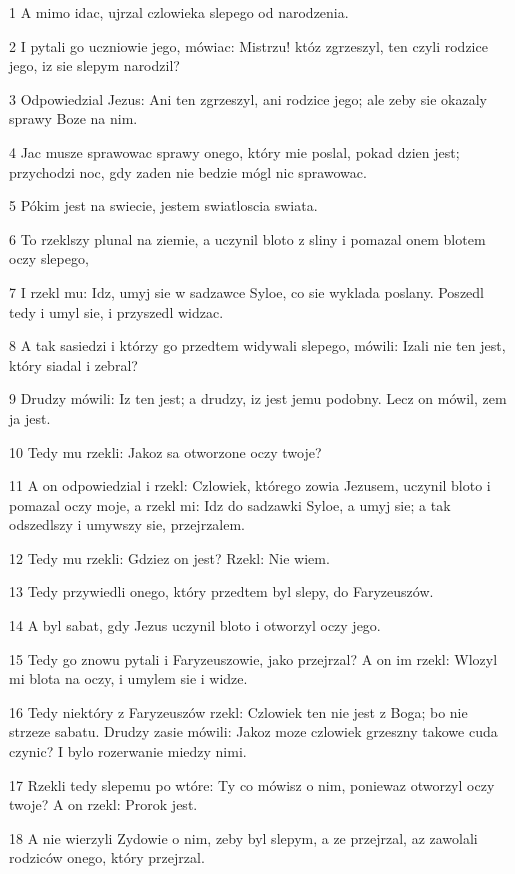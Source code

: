 \par 1 A mimo idac, ujrzal czlowieka slepego od narodzenia.
\par 2 I pytali go uczniowie jego, mówiac: Mistrzu! któz zgrzeszyl, ten czyli rodzice jego, iz sie slepym narodzil?
\par 3 Odpowiedzial Jezus: Ani ten zgrzeszyl, ani rodzice jego; ale zeby sie okazaly sprawy Boze na nim.
\par 4 Jac musze sprawowac sprawy onego, który mie poslal, pokad dzien jest; przychodzi noc, gdy zaden nie bedzie mógl nic sprawowac.
\par 5 Pókim jest na swiecie, jestem swiatloscia swiata.
\par 6 To rzeklszy plunal na ziemie, a uczynil bloto z sliny i pomazal onem blotem oczy slepego,
\par 7 I rzekl mu: Idz, umyj sie w sadzawce Syloe, co sie wyklada poslany. Poszedl tedy i umyl sie, i przyszedl widzac.
\par 8 A tak sasiedzi i którzy go przedtem widywali slepego, mówili: Izali nie ten jest, który siadal i zebral?
\par 9 Drudzy mówili: Iz ten jest; a drudzy, iz jest jemu podobny. Lecz on mówil, zem ja jest.
\par 10 Tedy mu rzekli: Jakoz sa otworzone oczy twoje?
\par 11 A on odpowiedzial i rzekl: Czlowiek, którego zowia Jezusem, uczynil bloto i pomazal oczy moje, a rzekl mi: Idz do sadzawki Syloe, a umyj sie; a tak odszedlszy i umywszy sie, przejrzalem.
\par 12 Tedy mu rzekli: Gdziez on jest? Rzekl: Nie wiem.
\par 13 Tedy przywiedli onego, który przedtem byl slepy, do Faryzeuszów.
\par 14 A byl sabat, gdy Jezus uczynil bloto i otworzyl oczy jego.
\par 15 Tedy go znowu pytali i Faryzeuszowie, jako przejrzal? A on im rzekl: Wlozyl mi blota na oczy, i umylem sie i widze.
\par 16 Tedy niektóry z Faryzeuszów rzekl: Czlowiek ten nie jest z Boga; bo nie strzeze sabatu. Drudzy zasie mówili: Jakoz moze czlowiek grzeszny takowe cuda czynic? I bylo rozerwanie miedzy nimi.
\par 17 Rzekli tedy slepemu po wtóre: Ty co mówisz o nim, poniewaz otworzyl oczy twoje? A on rzekl: Prorok jest.
\par 18 A nie wierzyli Zydowie o nim, zeby byl slepym, a ze przejrzal, az zawolali rodziców onego, który przejrzal.
